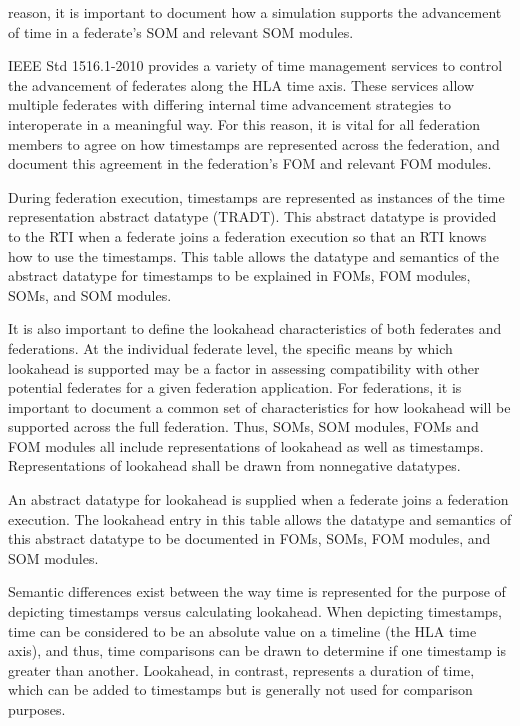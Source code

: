 
\newpage
reason, it is important to document how a simulation supports the advancement of time in a federate's SOM and relevant SOM modules.

IEEE Std 1516.1-2010 provides a variety of time management services to control the advancement of federates along the HLA time axis. These services allow multiple federates with differing internal time advancement strategies to interoperate in a meaningful way. For this reason, it is vital for all federation members to agree on how timestamps are represented across the federation, and document this agreement in the federation's FOM and relevant FOM modules.

During federation execution, timestamps are represented as instances of the time representation abstract datatype (TRADT). This abstract datatype is provided to the RTI when a federate joins a federation execution so that an RTI knows how to use the timestamps. This table allows the datatype and semantics of the abstract datatype for timestamps to be explained in FOMs, FOM modules, SOMs, and SOM modules.

It is also important to define the lookahead characteristics of both federates and federations. At the individual federate level, the specific means by which lookahead is supported may be a factor in assessing compatibility with other potential federates for a given federation application. For federations, it is important to document a common set of characteristics for how lookahead will be supported across the full federation. Thus, SOMs, SOM modules, FOMs and FOM modules all include representations of lookahead as well as timestamps. Representations of lookahead shall be drawn from nonnegative datatypes.

An abstract datatype for lookahead is supplied when a federate joins a federation execution. The lookahead entry in this table allows the datatype and semantics of this abstract datatype to be documented in FOMs, SOMs, FOM modules, and SOM modules.

Semantic differences exist between the way time is represented for the purpose of depicting timestamps versus calculating lookahead. When depicting timestamps, time can be considered to be an absolute value on a timeline (the HLA time axis), and thus, time comparisons can be drawn to determine if one timestamp is greater than another. Lookahead, in contrast, represents a duration of time, which can be added to timestamps but is generally not used for comparison purposes.

